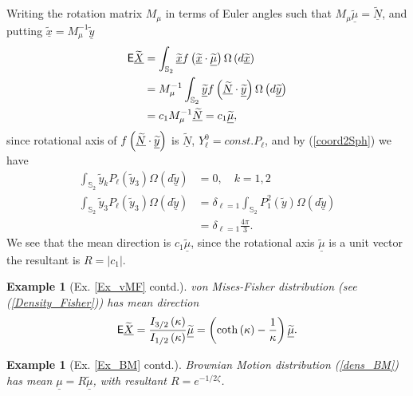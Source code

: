 \documentclass[preprint,11pt,a4paper]{elsarticle}
\newtheorem{example}[theorem]{Example}
\begin{document}
Writing the rotation matrix $M_{\mu}$ in terms of Euler angles such that $%
M_{\mu}\underline{\widetilde{\mu}}=\underline{\widetilde{N}}$, and putting $%
\underline{\widetilde{x}}=M_{\mu}^{-1}\underline{\widetilde{y}}$ 
\begin{align*}
\mathsf{E}\widetilde{\underline{X}} & =\int_{\mathbb{S}_{2}}\underline{%
\widetilde{x}}f\left( \underline{\widetilde{x}}\cdot \underline{\widetilde{%
\mu}}\right) \Omega\left( d\underline{\widetilde{x}}\right) \\
& =M_{\mu}^{-1}\int_{\mathbb{S}_{2}}\underline{\widetilde{y}}f\left( 
\underline{\widetilde{N}}\cdot\underline{\widetilde{y}}\right) \Omega\left( d%
\underline{\widetilde{y}}\right) \\
& =c_{1}M_{\mu}^{-1}\underline{\widetilde{N}}=c_{1}\underline{\widetilde{\mu 
}},
\end{align*}
since rotational axis of $f\left( \underline{\widetilde{N}}\cdot \underline{%
\widetilde{y}}\right) $ is $\underline{\widetilde{N}}$, $Y_{\ell
}^{0}=const.P_{\ell}$, and by (\ref{coord2Sph}) we have 
\begin{align*}
\int_{\mathbb{S}_{2}}\widetilde{y}_{k}P_{\ell}\left( \widetilde{y}%
_{3}\right) \Omega\left( d\underline{\widetilde{y}}\right) & =0,\quad k=1,2
\\
\int_{\mathbb{S}_{2}}\widetilde{y}_{3}P_{\ell}\left( \widetilde{y}%
_{3}\right) \Omega\left( d\underline{\widetilde{y}}\right) &
=\delta_{\ell=1}\int_{\mathbb{S}_{2}}P_{1}^{2}\left( \widetilde{y}\right)
\Omega\left( d\underline{\widetilde{y}}\right) \\
& =\delta_{\ell=1}\frac{4\pi}{3}.
\end{align*}
We see that the mean direction is $c_{1}\underline{\widetilde{\mu}}$, since
the rotational axis $\underline{\widetilde{\mu}}$ is a unit vector the
resultant is $R=\left\vert c_{1}\right\vert $.

\begin{example}[Ex. \protect\ref{Ex_vMF} contd.]
\textit{von Mises-Fisher} distribution (see (\ref{Density_Fisher})) has mean
direction%
\begin{equation*}
\mathsf{E}\widetilde{\underline{X}}=\frac{I_{3/2}\left( \kappa \right) }{%
I_{1/2}\left( \kappa \right) }\underline{\widetilde{\mu }}=\left( \coth
\left( \kappa \right) -\frac{1}{\kappa }\right) \underline{\widetilde{\mu }}.
\end{equation*}
\end{example}

\begin{example}[Ex. \protect\ref{Ex_BM} contd.]
Brownian Motion distribution (\ref{dens_BM}) has mean $\underline{\mu }=R%
\underline{\widetilde{\mu }}$, with resultant $R=e^{-1/2\zeta }$.
\end{example}
\end{document}
